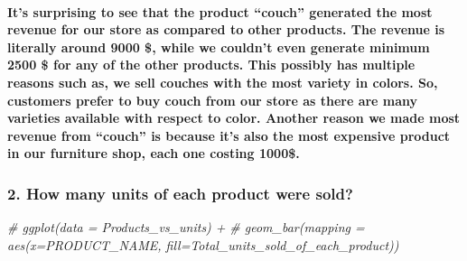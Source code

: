 \documentclass[
]{article}
\newenvironment{Shaded}{\begin{snugshade}}{\end{snugshade}}
\newcommand{\CommentTok}[1]{\textcolor[rgb]{0.56,0.35,0.01}{\textit{#1}}}
\begin{document}
\hypertarget{its-surprising-to-see-that-the-product-couch-generated-the-most-revenue-for-our-store-as-compared-to-other-products.-the-revenue-is-literally-around-9000-while-we-couldnt-even-generate-minimum-2500-for-any-of-the-other-products.-this-possibly-has-multiple-reasons-such-as-we-sell-couches-with-the-most-variety-in-colors.-so-customers-prefer-to-buy-couch-from-our-store-as-there-are-many-varieties-available-with-respect-to-color.-another-reason-we-made-most-revenue-from-couch-is-because-its-also-the-most-expensive-product-in-our-furniture-shop-each-one-costing-1000.}{%
\paragraph{It's surprising to see that the product ``couch'' generated
the most revenue for our store as compared to other products. The
revenue is literally around 9000 \$, while we couldn't even generate
minimum 2500 \$ for any of the other products. This possibly has
multiple reasons such as, we sell couches with the most variety in
colors. So, customers prefer to buy couch from our store as there are
many varieties available with respect to color. Another reason we made
most revenue from ``couch'' is because it's also the most expensive
product in our furniture shop, each one costing
1000\$.}\label{its-surprising-to-see-that-the-product-couch-generated-the-most-revenue-for-our-store-as-compared-to-other-products.-the-revenue-is-literally-around-9000-while-we-couldnt-even-generate-minimum-2500-for-any-of-the-other-products.-this-possibly-has-multiple-reasons-such-as-we-sell-couches-with-the-most-variety-in-colors.-so-customers-prefer-to-buy-couch-from-our-store-as-there-are-many-varieties-available-with-respect-to-color.-another-reason-we-made-most-revenue-from-couch-is-because-its-also-the-most-expensive-product-in-our-furniture-shop-each-one-costing-1000.}}

\hypertarget{how-many-units-of-each-product-were-sold-1}{%
\subsubsection{2. How many units of each product were
sold?}\label{how-many-units-of-each-product-were-sold-1}}

\begin{Shaded}
\begin{Highlighting}[]
\CommentTok{\# ggplot(data = Products\_vs\_units) +}
\CommentTok{\#   geom\_bar(mapping = aes(x=PRODUCT\_NAME, fill=Total\_units\_sold\_of\_each\_product))}
\end{Highlighting}
\end{Shaded}
\end{document}
